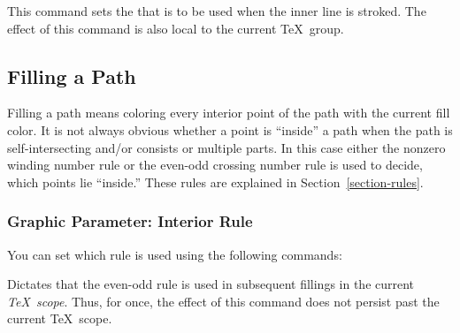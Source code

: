 \begin{command}{\pgfsetinnerstrokecolor{}}
  This command sets the  that is to be used when the inner
  line is stroked. The effect of this command is also local to the
  current \TeX\ group.

\begin{codeexample}[]
\begin{pgfpicture}
  \pgfpathmoveto{\pgfpointorigin}
  \pgfpathlineto{\pgfpoint{1cm}{1cm}}
  \pgfpathlineto{\pgfpoint{1cm}{0cm}}
  \pgfsetlinewidth{2pt}
  \pgfsetinnerlinewidth{1pt}
\end{pgfpicture}
\end{codeexample}
\end{command}


\subsection{Filling a Path}
\label{section-fill}

Filling a path means coloring every interior point of the path with
the current fill color. It is not always obvious whether a point is
``inside'' a  path when the path is self-intersecting and/or consists
or multiple parts. In this case either the nonzero winding number rule
or the even-odd crossing number rule is used to decide, which points
lie ``inside.'' These rules are explained in
Section~\ref{section-rules}.

\subsubsection{Graphic Parameter: Interior Rule}

You can set which rule is used using the following commands:

\begin{command}{\pgfseteorule}
  Dictates that the even-odd rule is used in subsequent fillings in
  the current \emph{\TeX\ scope}. Thus, for once, the effect of this
  command does not persist past the current \TeX\ scope.

\begin{codeexample}[]
\begin{pgfpicture}
  \pgfseteorule
  \pgfpathcircle{\pgfpoint{0mm}{0cm}}{7mm}
  \pgfpathcircle{\pgfpoint{5mm}{0cm}}{7mm}
\end{pgfpicture}
\end{codeexample}
\end{command}

